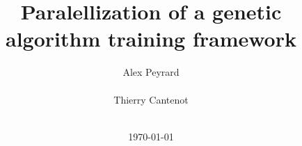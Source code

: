 \documentclass{acm_proc_article-sp}
\begin{document}
\title{Paralellization of a genetic algorithm training framework}
%
%
%
%
%

%
\author{
%
%
\alignauthor
Alex Peyrard\\
       \\
\alignauthor
Thierry Cantenot\\
       \\
}
\date{\today}
\end{document}
